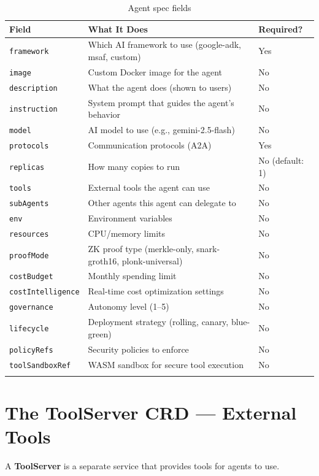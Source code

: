 \documentclass[12pt,a4paper,openany]{report}
\begin{document}
\begin{longtable}{p{4cm}p{8cm}p{2.5cm}}
\toprule
\textbf{Field} & \textbf{What It Does} & \textbf{Required?} \\
\midrule
\endhead
\texttt{framework} & Which AI framework to use (google-adk, msaf, custom) & Yes \\
\texttt{image} & Custom Docker image for the agent & No \\
\texttt{description} & What the agent does (shown to users) & No \\
\texttt{instruction} & System prompt that guides the agent's behavior & No \\
\texttt{model} & AI model to use (e.g., gemini-2.5-flash) & No \\
\texttt{protocols} & Communication protocols (A2A) & Yes \\
\texttt{replicas} & How many copies to run & No (default: 1) \\
\texttt{tools} & External tools the agent can use & No \\
\texttt{subAgents} & Other agents this agent can delegate to & No \\
\texttt{env} & Environment variables & No \\
\texttt{resources} & CPU/memory limits & No \\
\texttt{proofMode} & ZK proof type (merkle-only, snark-groth16, plonk-universal) & No \\
\texttt{costBudget} & Monthly spending limit & No \\
\texttt{costIntelligence} & Real-time cost optimization settings & No \\
\texttt{governance} & Autonomy level (1–5) & No \\
\texttt{lifecycle} & Deployment strategy (rolling, canary, blue-green) & No \\
\texttt{policyRefs} & Security policies to enforce & No \\
\texttt{toolSandboxRef} & WASM sandbox for secure tool execution & No \\
\bottomrule
\caption{Agent spec fields}
\end{longtable}

\section{The ToolServer CRD — External Tools}

A \textbf{ToolServer} is a separate service that provides tools for agents to use.
\end{document}
